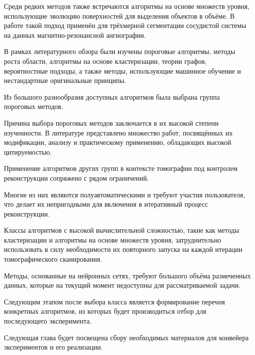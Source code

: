 Среди редких методов также встречаются алгоритмы на основе множеств уровня, использующие эволюцию поверхностей для выделения объектов в объёме. В работе \cite{farag20043d} такой подход применён для трёхмерной сегментации сосудистой системы на данных магнитно-резонансной ангиографии.

В рамках литературного обзора были изучены пороговые алгоритмы, методы роста области, алгоритмы на основе кластеризации, теории графов, вероятностные подходы, а также методы, использующие машинное обучение и нестандартные оригинальные принципы.

Из большого разнообразия доступных алгоритмов была выбрана группа пороговых методов.

Причина выбора пороговых методов заключается в их высокой степени изученности. В литературе представлено множество работ, посвящённых их модификации, анализу и практическому применению, обладающих высокой цитируемостью.

Применение алгоритмов других групп в контексте томографии под контролем реконструкции сопряжено с рядом ограничений. 

Многие из них являются полуавтоматическими и требуют участия пользователя, что делает их непригодными для включения в итеративный процесс реконструкции. 

Классы алгоритмов с высокой вычислительной сложностью, такие как методы кластеризации и алгоритмы на основе множеств уровня, затруднительно использовать в силу необходимости их повторного запуска на каждой итерации томографического сканирования. 

Методы, основанные на нейронных сетях, требуют большого объёма размеченных данных, которые на текущий момент недоступны для рассматриваемой задачи.

Следующим этапом после выбора класса является формирование перечня конкретных алгоритмов, из которых будет производиться отбор для последующего эксперимента.

Следующая глава будет посвещена сбору необходимых материалов для конвейера экспериментов и его реализации.